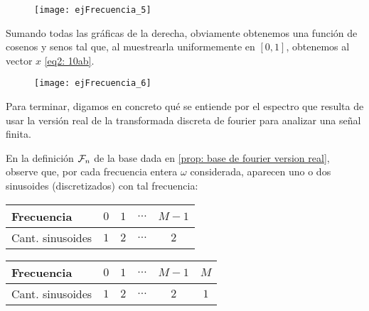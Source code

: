 \begin{ejemplo}
\begin{figure}[H]
	\centering
	\texttt{[image: ejFrecuencia\_5]} 
\end{figure}	

Sumando todas las gráficas de la derecha, obviamente
obtenemos una función de cosenos y senos tal que,
al muestrearla uniformemente en $[0,1]$, obtenemos
al vector $x$ \eqref{eq2: 10ab}.

\begin{figure}[H]
	\centering
	\texttt{[image: ejFrecuencia\_6]} 
\end{figure}	
\final
\end{ejemplo}

Para terminar, digamos en concreto qué se entiende
por el espectro que resulta de usar la 
versión real de la transformada
discreta de fourier para analizar una señal finita.

En la definición 
$\mathcal{F}_{n}$ de la base dada en 
\ref{prop: base de fourier version real}, observe que, 
por cada frecuencia entera $\omega$ considerada,
aparecen uno o dos sinusoides (discretizados) con tal frecuencia:


\begin{table}[ht]
\centering
  \begin{tabular}{ l | c | c | c | c }
    \hline
    Frecuencia & $0$ & $1$ & $\ldots$ & $M-1$  \\ \hline
    Cant. sinusoides  & $1$ & $2$ & $\ldots$ & $2$ \\
    \hline
  \end{tabular}
\label{Tab: frecuencias TDF n impar}
\end{table}

\vspace{2cm}

\begin{table}[ht]
\centering
  \begin{tabular}{ l | c | c | c | c | c}
    \hline
    Frecuencia & $0$ & $1$ & $\ldots$ & $M-1$ & $M$  \\ \hline
    Cant. sinusoides  & $1$ & $2$ & $\ldots$ & $2$ & $1$ \\
    \hline
  \end{tabular}
\label{Tab: frecuencias TDF n par}
\end{table}


